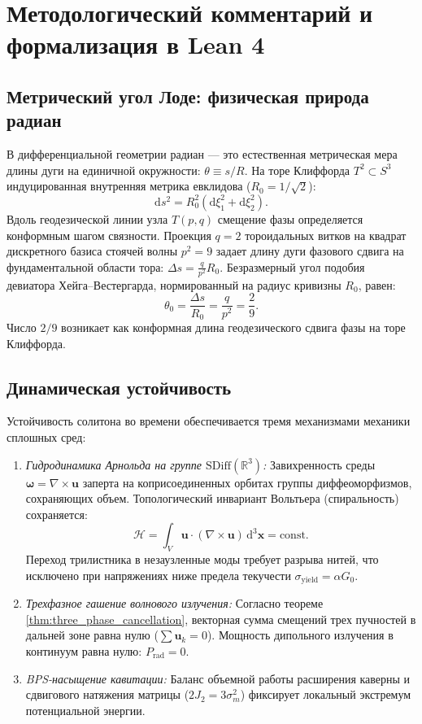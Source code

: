 \documentclass[11pt,a4paper]{article}
\theoremstyle{definition}
\theoremstyle{remark}
\begin{document}
\section{Методологический комментарий и формализация в Lean 4}
\subsection{Метрический угол Лоде: физическая природа радиан}

В дифференциальной геометрии радиан — это естественная метрическая мера длины дуги на единичной окружности: $\theta \equiv s / R$. На торе Клиффорда $T^2 \subset S^3$ индуцированная внутренняя метрика евклидова ($R_0 = 1/\sqrt{2}$):
\begin{equation}
	\mathrm{d}s^2 = R_0^2 (\mathrm{d}\xi_1^2 + \mathrm{d}\xi_2^2).
\end{equation}
Вдоль геодезической линии узла $T(p,q)$ смещение фазы определяется конформным шагом связности. Проекция $q=2$ тороидальных витков на квадрат дискретного базиса стоячей волны $p^2 = 9$ задает длину дуги фазового сдвига на фундаментальной области тора: $\Delta s = \frac{q}{p^2} R_0$. Безразмерный угол подобия девиатора Хейга--Вестергарда, нормированный на радиус кривизны $R_0$, равен:
\begin{equation}
	\theta_0 = \frac{\Delta s}{R_0} = \frac{q}{p^2} = \frac{2}{9}.
\end{equation}
Число $2/9$ возникает как конформная длина геодезического сдвига фазы на торе Клиффорда.

\subsection{Динамическая устойчивость}

Устойчивость солитона во времени обеспечивается тремя механизмами механики сплошных сред:
\begin{enumerate}
\item \textit{Гидродинамика Арнольда на группе $\mathrm{SDiff}(\mathbb{R}^3)$:} Завихренность среды $\boldsymbol{\omega} = \nabla \times \mathbf{u}$ заперта на коприсоединенных орбитах группы диффеоморфизмов, сохраняющих объем. Топологический инвариант Вольтьера (спиральность) сохраняется:
\begin{equation}
\mathcal{H} = \int_V \mathbf{u} \cdot (\nabla \times \mathbf{u}) \, \mathrm{d}^3\mathbf{x} = \text{const}.
\end{equation}
	Переход трилистника в незаузленные моды требует разрыва нитей, что исключено при напряжениях ниже предела текучести $\sigma_{\mathrm{yield}} = \alpha G_0$.
\item \textit{Трехфазное гашение волнового излучения:} Согласно теореме \ref{thm:three_phase_cancellation}, векторная сумма смещений трех пучностей в дальней зоне равна нулю ($\sum \mathbf{u}_k = 0$). Мощность дипольного излучения в континуум равна нулю: $P_{\mathrm{rad}} = 0$.
\item \textit{BPS-насыщение кавитации:} Баланс объемной работы расширения каверны и сдвигового натяжения матрицы ($2J_2 = 3\sigma_m^2$) фиксирует локальный экстремум потенциальной энергии.
\end{enumerate}
\end{document}
